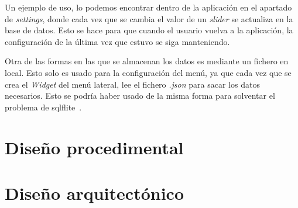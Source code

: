 \begin{itemize}
	Un ejemplo de uso, lo podemos encontrar dentro de la aplicación en el apartado de \emph{settings}, donde cada vez que se cambia el valor de un \emph{slider} se actualiza en la base de datos. Esto se hace para que cuando el usuario vuelva a la aplicación, la configuración de la última vez que estuvo se siga manteniendo.
	
\end{itemize}

Otra de las formas en las que se almacenan los datos es mediante un fichero en local. Esto solo es usado para la configuración del menú, ya que cada vez que se crea el \emph{Widget} del menú lateral, lee el fichero \emph{.json} para sacar los datos necesarios. Esto se podría haber usado de la misma forma para solventar el problema de sqlflite~\pageref{sqlflite}.

\section{Diseño procedimental}

\section{Diseño arquitectónico}


